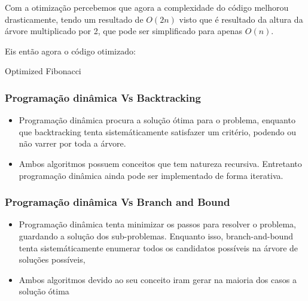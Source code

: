     Com a otimização percebemos que agora a complexidade do 
    código melhorou drasticamente, tendo um resultado de 
    $O(2n)$ visto que é resultado da altura da árvore multiplicado 
    por 2, que pode ser simplificado para apenas $O(n)$.

    Eis então agora o código otimizado:

    \begin{algorithm}
      \caption{Optimized Fibonacci} 
      \begin{algorithmic}[1]
      \EndIf
      \EndIf
      \EndProcedure
      \end{algorithmic}
    \end{algorithm}

    \subsubsection{Programação dinâmica Vs Backtracking}

    \begin{itemize}
      \item Programação dinâmica procura a solução ótima para o problema, enquanto 
      que backtracking tenta sistemáticamente satisfazer um critério, podendo ou não 
      varrer por toda a árvore.
      \item Ambos algoritmos possuem conceitos que tem natureza recursiva. Entretanto
      programação dinâmica ainda pode ser implementado de forma iterativa.
    \end{itemize}

    \subsubsection{Programação dinâmica Vs Branch and Bound}

    \begin{itemize}
        \item Programação dinâmica tenta minimizar os passos para resolver 
        o problema, guardando a solução dos sub-problemas. Enquanto isso, 
        branch-and-bound tenta sistemáticamente enumerar todos os candidatos 
        possíveis na árvore de soluções possíveis,
        \item Ambos algoritmos devido ao seu conceito iram gerar na maioria dos 
        casos a solução ótima
    \end{itemize}

    \nocite{dynamic-programming}

\newpage